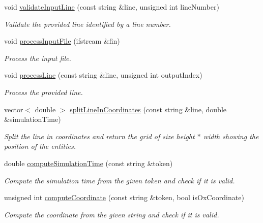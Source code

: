 \begin{DoxyCompactItemize}
void \hyperlink{classmultiscale_1_1video_1_1RectangularEntityCsvToInputFilesConverter_a582115870468210176bedb1f69b244ac}{validate\-Input\-Line} (const string \&line, unsigned int line\-Number)
\begin{DoxyCompactList}\small\item\em \-Validate the provided line identified by a line number. \end{DoxyCompactList}\item 
void \hyperlink{classmultiscale_1_1video_1_1RectangularEntityCsvToInputFilesConverter_a10ba353be4f381a88d53b9433c3b7e1a}{process\-Input\-File} (ifstream \&fin)
\begin{DoxyCompactList}\small\item\em \-Process the input file. \end{DoxyCompactList}\item 
void \hyperlink{classmultiscale_1_1video_1_1RectangularEntityCsvToInputFilesConverter_ade459298271cab474b2e9e7bdd583733}{process\-Line} (const string \&line, unsigned int output\-Index)
\begin{DoxyCompactList}\small\item\em \-Process the provided line. \end{DoxyCompactList}\item 
vector$<$ double $>$ \hyperlink{classmultiscale_1_1video_1_1RectangularEntityCsvToInputFilesConverter_a452c51fa3e5b1357f2f71aa401127087}{split\-Line\-In\-Coordinates} (const string \&line, double \&simulation\-Time)
\begin{DoxyCompactList}\small\item\em \-Split the line in coordinates and return the grid of size height $\ast$ width showing the position of the entities. \end{DoxyCompactList}\item 
double \hyperlink{classmultiscale_1_1video_1_1RectangularEntityCsvToInputFilesConverter_a8a48052e9b1c1700d15b04f50bf65f2b}{compute\-Simulation\-Time} (const string \&token)
\begin{DoxyCompactList}\small\item\em \-Compute the simulation time from the given token and check if it is valid. \end{DoxyCompactList}\item 
unsigned int \hyperlink{classmultiscale_1_1video_1_1RectangularEntityCsvToInputFilesConverter_a3defc5af07ae2c1d383c66ab15964b1c}{compute\-Coordinate} (const string \&token, bool is\-Ox\-Coordinate)
\begin{DoxyCompactList}\small\item\em \-Compute the coordinate from the given string and check if it is valid. \end{DoxyCompactList}\item 

\end{DoxyCompactItemize}
